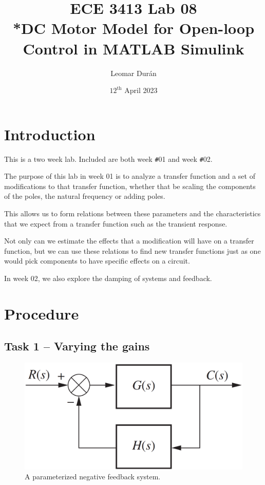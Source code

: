 \documentclass[12pt]{article}
\title{ECE 3413 Lab 08\\*DC Motor Model for Open-loop Control in MATLAB Simulink}
\author{Leomar Dur\'an}
\date{${12}^{\text{th}}$ April 2023}
\begin{document}
\maketitle
\newpage

\section{Introduction}

This is a two week lab.
Included are both week \texttt\#01 and week \texttt\#02.

The purpose of this lab in week 01 is to analyze a transfer function
and a set of modifications to that transfer function,
whether that be scaling the components of the poles, the natural frequency or adding poles.

This allows us to form relations between these parameters and the characteristics that we expect from a transfer function such as the transient response.

Not only can we estimate the effects that a modification will have on a transfer function, but we can use these relations to find new transfer functions just as one would pick components to have specific effects on a circuit.

In week 02, we also explore the damping of systems and feedback.

\section{Procedure}\label{sec:procedure}

\subsection{Task 1 -- Varying the gains}\label{ssc:vary gains}



\begin{figure}
    \centering
    \includegraphics[width=.8\linewidth]{img/lab06-0000-negative_feedback_system.png}
    \caption{A parameterized negative feedback system.}
    \label{fig:negative feed back system}
\end{figure}
\end{document}
